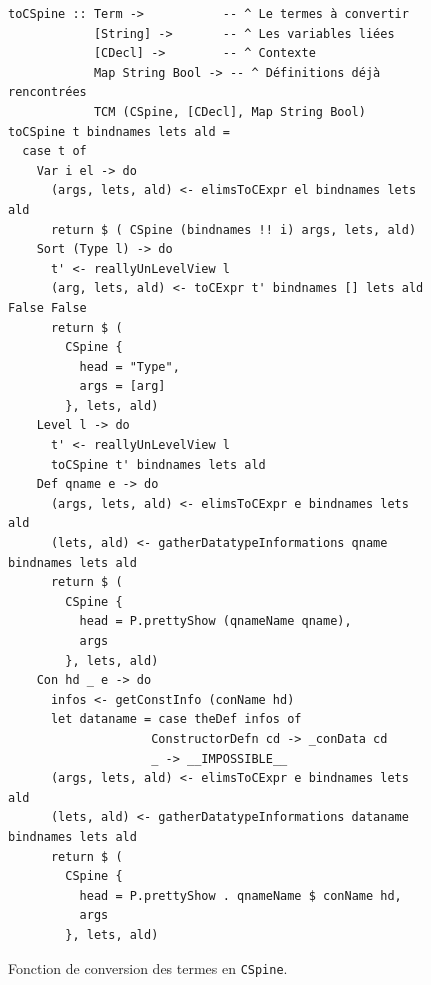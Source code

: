 \documentclass[11pt]{article}
\begin{document}
\begin{figure}[h]
\centering
\begin{verbatim}
toCSpine :: Term ->           -- ^ Le termes à convertir
            [String] ->       -- ^ Les variables liées
            [CDecl] ->        -- ^ Contexte
            Map String Bool -> -- ^ Définitions déjà rencontrées
            TCM (CSpine, [CDecl], Map String Bool)
toCSpine t bindnames lets ald =
  case t of
    Var i el -> do
      (args, lets, ald) <- elimsToCExpr el bindnames lets ald
      return $ ( CSpine (bindnames !! i) args, lets, ald)
    Sort (Type l) -> do
      t' <- reallyUnLevelView l
      (arg, lets, ald) <- toCExpr t' bindnames [] lets ald False False
      return $ (
        CSpine {
          head = "Type",
          args = [arg]
        }, lets, ald)
    Level l -> do
      t' <- reallyUnLevelView l
      toCSpine t' bindnames lets ald
    Def qname e -> do
      (args, lets, ald) <- elimsToCExpr e bindnames lets ald
      (lets, ald) <- gatherDatatypeInformations qname bindnames lets ald
      return $ (
        CSpine {
          head = P.prettyShow (qnameName qname),
          args
        }, lets, ald)
    Con hd _ e -> do
      infos <- getConstInfo (conName hd)
      let dataname = case theDef infos of
                    ConstructorDefn cd -> _conData cd
                    _ -> __IMPOSSIBLE__
      (args, lets, ald) <- elimsToCExpr e bindnames lets ald
      (lets, ald) <- gatherDatatypeInformations dataname bindnames lets ald
      return $ (
        CSpine {
          head = P.prettyShow . qnameName $ conName hd,
          args
        }, lets, ald)
\end{verbatim}
\caption{Fonction de conversion des termes en \texttt{CSpine}.}
\label{fig:agda-toCSpine}
\end{figure}
\end{document}
